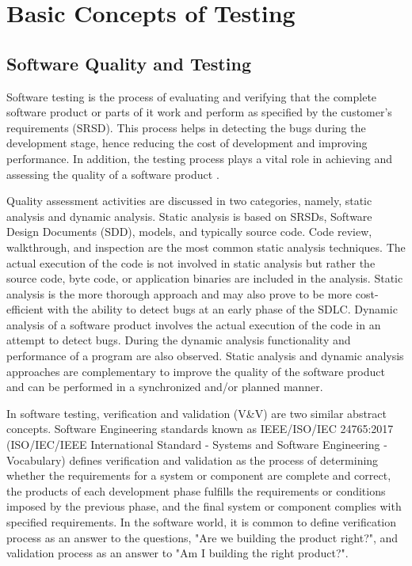 \setchapterpreamble[u]{\margintoc}
\chapter{Basic Concepts of Testing}
\section{Software Quality and Testing}
Software testing is the process of evaluating and verifying that the complete software product or parts of it work and perform as specified by the customer's requirements (SRSD). This process helps in detecting the bugs during the development stage, hence reducing the cost of development and improving performance. In addition, the testing process plays a vital role in achieving and assessing the quality of a software
product \autocite{friedman1995software}. 

Quality assessment activities are discussed in two categories, namely, static analysis and dynamic analysis. Static analysis is based on SRSDs, Software Design Documents (SDD), models, and typically source code. Code review, walkthrough, and inspection are the most common static analysis techniques. The actual execution of the code is not involved in static analysis but rather the source code, byte code, or application binaries are included in the analysis. Static analysis is the more thorough approach and may also prove to be more cost-efficient with the ability to detect bugs at an early phase of the SDLC. Dynamic analysis of a software product involves the actual execution of the code in an attempt to detect bugs. During the dynamic analysis functionality and performance of a program are also observed. Static analysis and dynamic analysis approaches are complementary to improve the quality of the software product and can be performed in a synchronized and/or planned manner.

In software testing, verification and validation (V\&V) are two similar abstract concepts. Software Engineering standards known as IEEE/ISO/IEC 24765:2017 (ISO/IEC/IEEE International Standard - Systems and Software Engineering - Vocabulary) defines verification and validation as the process of determining whether the requirements for a system or component are complete and correct, the products of each development phase fulfills the requirements or conditions imposed by the previous phase, and the final system or component complies with specified requirements. In the software world, it is common to define verification process as an answer to the questions, "Are we building the product right?", and validation process as an answer to "Am I building the right product?".


